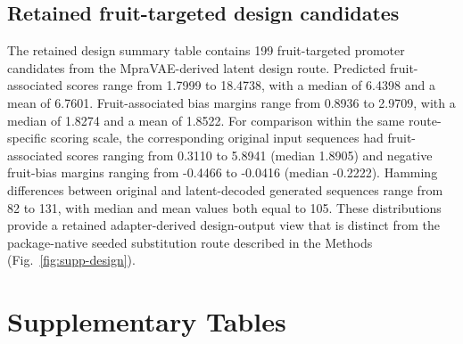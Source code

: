 \documentclass[10pt]{article}
\begin{document}
\subsection{Retained fruit-targeted design candidates}

The retained design summary table contains 199 fruit-targeted promoter candidates from the MpraVAE-derived latent design route. Predicted fruit-associated scores range from 1.7999 to 18.4738, with a median of 6.4398 and a mean of 6.7601. Fruit-associated bias margins range from 0.8936 to 2.9709, with a median of 1.8274 and a mean of 1.8522. For comparison within the same route-specific scoring scale, the corresponding original input sequences had fruit-associated scores ranging from 0.3110 to 5.8941 (median 1.8905) and negative fruit-bias margins ranging from -0.4466 to -0.0416 (median -0.2222). Hamming differences between original and latent-decoded generated sequences range from 82 to 131, with median and mean values both equal to 105. These distributions provide a retained adapter-derived design-output view that is distinct from the package-native seeded substitution route described in the Methods (Fig.~\ref{fig:supp-design}).

\section{Supplementary Tables}

\end{document}
